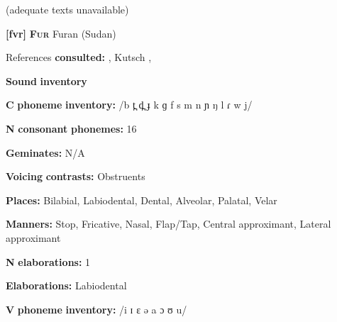 \begin{styleBody}
(adequate texts unavailable)
\end{styleBody}

\begin{styleBody}
\textbf{[fvr]}   \textbf{\textsc{Fur}}  Furan (Sudan)
\end{styleBody}

\begin{styleBody}
References \textbf{consulted:} \citet{Jakobi1990}, Kutsch \citet{LojengaWaag2004}, \citet{Noel2008}
\end{styleBody}

\begin{styleBody}
\textbf{Sound} \textbf{inventory}
\end{styleBody}

\begin{styleBody}
\textbf{C} \textbf{phoneme} \textbf{inventory:} /b t̪ d̪ ɟ k ɡ f s m n ɲ ŋ l ɾ w j/
\end{styleBody}

\begin{styleBody}
\textbf{N} \textbf{consonant} \textbf{phonemes:} 16
\end{styleBody}

\begin{styleBody}
\textbf{Geminates:} N/A
\end{styleBody}

\begin{styleBody}
\textbf{Voicing} \textbf{contrasts:} Obstruents
\end{styleBody}

\begin{styleBody}
\textbf{Places:} Bilabial, Labiodental, Dental, Alveolar, Palatal, Velar
\end{styleBody}

\begin{styleBody}
\textbf{Manners:} Stop, Fricative, Nasal, Flap/Tap, Central approximant, Lateral approximant
\end{styleBody}

\begin{styleBody}
\textbf{N} \textbf{elaborations:} 1
\end{styleBody}

\begin{styleBody}
\textbf{Elaborations:} Labiodental
\end{styleBody}

\begin{styleBody}
\textbf{V} \textbf{phoneme} \textbf{inventory:} /i ɪ ɛ ə a ɔ ʊ u/
\end{styleBody}


